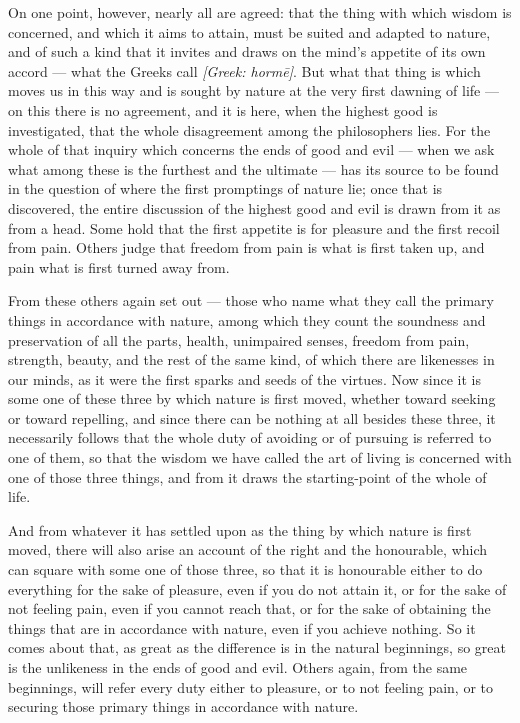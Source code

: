  On one point, however, nearly all are agreed: that the thing with which wisdom is concerned, and which it aims to attain, must be suited and adapted to nature, and of such a kind that it invites and draws on the mind's appetite of its own accord — what the Greeks call \textit{[Greek: hormē]}. But what that thing is which moves us in this way and is sought by nature at the very first dawning of life — on this there is no agreement, and it is here, when the highest good is investigated, that the whole disagreement among the philosophers lies. For the whole of that inquiry which concerns the ends of good and evil — when we ask what among these is the furthest and the ultimate — has its source to be found in the question of where the first promptings of nature lie; once that is discovered, the entire discussion of the highest good and evil is drawn from it as from a head. Some hold that the first appetite is for pleasure and the first recoil from pain. Others judge that freedom from pain is what is first taken up, and pain what is first turned away from.

 From these others again set out — those who name what they call the primary things in accordance with nature, among which they count the soundness and preservation of all the parts, health, unimpaired senses, freedom from pain, strength, beauty, and the rest of the same kind, of which there are likenesses in our minds, as it were the first sparks and seeds of the virtues. Now since it is some one of these three by which nature is first moved, whether toward seeking or toward repelling, and since there can be nothing at all besides these three, it necessarily follows that the whole duty of avoiding or of pursuing is referred to one of them, so that the wisdom we have called the art of living is concerned with one of those three things, and from it draws the starting-point of the whole of life.

 And from whatever it has settled upon as the thing by which nature is first moved, there will also arise an account of the right and the honourable, which can square with some one of those three, so that it is honourable either to do everything for the sake of pleasure, even if you do not attain it, or for the sake of not feeling pain, even if you cannot reach that, or for the sake of obtaining the things that are in accordance with nature, even if you achieve nothing. So it comes about that, as great as the difference is in the natural beginnings, so great is the unlikeness in the ends of good and evil. Others again, from the same beginnings, will refer every duty either to pleasure, or to not feeling pain, or to securing those primary things in accordance with nature.

